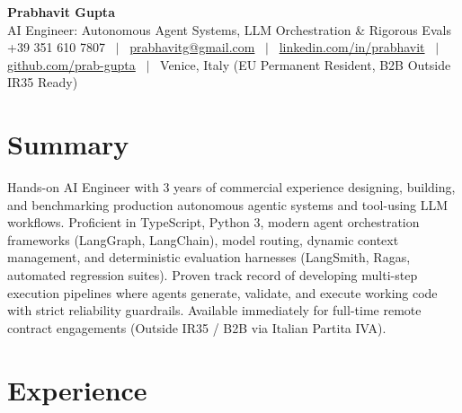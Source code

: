 \documentclass[a4paper,10pt]{article}
\begin{document}
\begin{minipage}[c]{0.80\textwidth}
  {\Huge\bfseries Prabhavit Gupta}\\[3pt]
  {\color{accent}\large AI Engineer: Autonomous Agent Systems, LLM Orchestration \& Rigorous Evals}\\[6pt]
  {\footnotesize +39 351 610 7807 ~$\vert$~
  \href{mailto:prabhavitg@gmail.com}{prabhavitg@gmail.com} ~$\vert$~
  \href{https://www.linkedin.com/in/prabhavit/}{linkedin.com/in/prabhavit} ~$\vert$~
  \href{https://github.com/prab-gupta}{github.com/prab-gupta} ~$\vert$~
  Venice, Italy (EU Permanent Resident, B2B Outside IR35 Ready)}
\end{minipage}\hfill

\section{Summary}
Hands-on AI Engineer with 3 years of commercial experience designing, building, and benchmarking production autonomous agentic systems and tool-using LLM workflows. Proficient in TypeScript, Python 3, modern agent orchestration frameworks (LangGraph, LangChain), model routing, dynamic context management, and deterministic evaluation harnesses (LangSmith, Ragas, automated regression suites). Proven track record of developing multi-step execution pipelines where agents generate, validate, and execute working code with strict reliability guardrails. Available immediately for full-time remote contract engagements (Outside IR35 / B2B via Italian Partita IVA).

\section{Experience}
\end{document}
